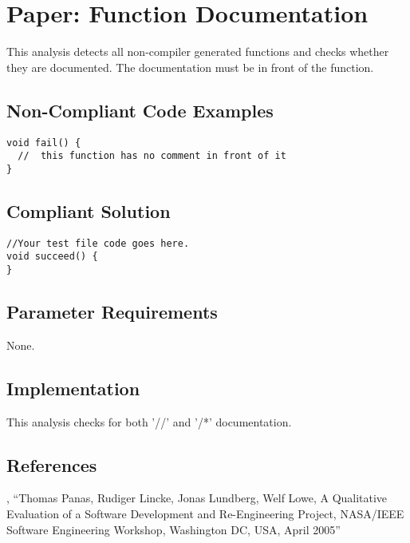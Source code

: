 \section{Paper: Function Documentation}

This analysis detects all non-compiler generated functions and checks whether they are documented.
The documentation must be in front of the function. 

\subsection{Non-Compliant Code Examples}
\begin{verbatim}
void fail() {
  //  this function has no comment in front of it
}
\end{verbatim}

\subsection{Compliant Solution}
\begin{verbatim}
//Your test file code goes here.
void succeed() {
}
\end{verbatim}


\subsection{Parameter Requirements}

None.

\subsection{Implementation}

This analysis checks for both '//' and '/*' documentation.



\subsection{References}

 , ``Thomas Panas, Rudiger Lincke, Jonas Lundberg, Welf Lowe, A Qualitative Evaluation of a Software Development and Re-Engineering Project, NASA/IEEE Software Engineering Workshop, Washington DC, USA, April 2005''

